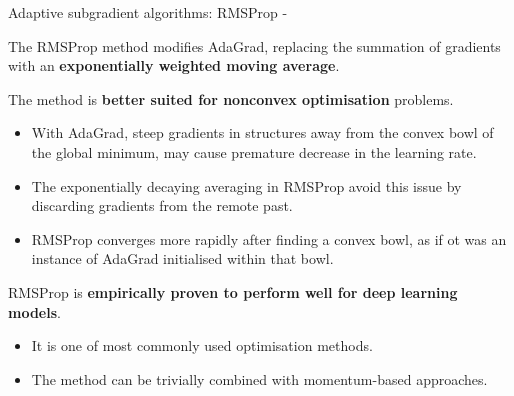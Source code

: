 


\begin{frame}[t,allowframebreaks]{
    Adaptive subgradient algorithms: RMSProp -}

    The \gls{RMSProp} method \cite{Hinton:2012rmsp}
    modifies \gls{AdaGrad}, replacing 
    the summation of \glspl{gradient} with an 
    {\bf exponentially weighted moving average}.\\
    \vspace{0.2cm}

    The method is {\bf better suited 
    for nonconvex \gls{optimisation}} problems.\\

    \begin{itemize}
        \small
        \item 
        With \gls{AdaGrad},
        steep gradients in structures away from the convex bowl of
        the global minimum, may cause premature decrease in the 
        \gls{learning rate}.
        \item
        The exponentially decaying averaging in \gls{RMSProp}
        avoid this issue by discarding \glspl{gradient} 
        from the remote past.
        \item
        \gls{RMSProp} converges more rapidly after finding a convex bowl,
        as if ot was an instance of \gls{AdaGrad} initialised within
        that bowl.
    \end{itemize}

    \vspace{0.2cm}

    \gls{RMSProp} is {\bf empirically proven to perform well for  
    deep learning models}.
    \begin{itemize}
        \small
        \item It is one of most commonly used
        \gls{optimisation} methods.
        \item The method can be trivially combined with 
        \gls{momentum}-based approaches.
    \end{itemize}

\end{frame}